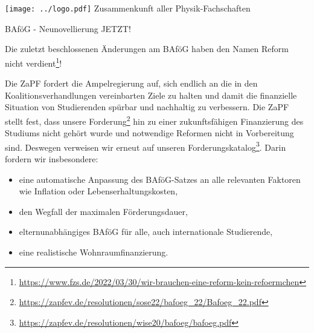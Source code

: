 \documentclass[DIV=calc]{scrartcl}
\let\oldgrqq=\grqq
\def\grqq{\oldgrqq\xspace}
\begin{document}
\hspace{0.87\textwidth}
\begin{minipage}{120pt}
\vspace{-1.8cm}
\texttt{[image: ../logo.pdf]}
\centering
\small Zusammenkunft aller Physik-Fachschaften
\end{minipage}

\begin{center}
  \huge{BAföG - Neunovellierung JETZT!}\vspace{.25\baselineskip}\\
  \normalsize
\end{center}
\vspace{1cm}







Die zuletzt beschlossenen Änderungen am BAföG haben den Namen \glqq Reform\grqq nicht verdient\footnote{\url{https://www.fzs.de/2022/03/30/wir-brauchen-eine-reform-kein-refoermchen}}!

Die ZaPF fordert die Ampelregierung auf, sich endlich an die in den Koalitionsverhandlungen vereinbarten Ziele zu halten und damit die finanzielle Situation von Studierenden spürbar und nachhaltig zu verbessern.
Die ZaPF stellt fest, dass unsere Forderung\footnote{\url{https://zapfev.de/resolutionen/sose22/bafoeg_22/Bafoeg_22.pdf}} hin zu einer zukunftsfähigen Finanzierung des Studiums nicht gehört wurde und notwendige Reformen nicht in Vorbereitung sind.
Deswegen verweisen wir erneut auf unseren Forderungskatalog\footnote{\url{https://zapfev.de/resolutionen/wise20/bafoeg/bafoeg.pdf}}. Darin fordern wir insbesondere:
\begin{itemize}
	\item eine automatische Anpassung des BAföG-Satzes an alle relevanten Faktoren wie Inflation oder Lebenserhaltungskosten,
	\item den Wegfall der maximalen Förderungsdauer,
	\item elternunabhängiges BAföG für alle, auch internationale Studierende,
	\item eine realistische Wohnraumfinanzierung. 
\end{itemize}
\end{document}

